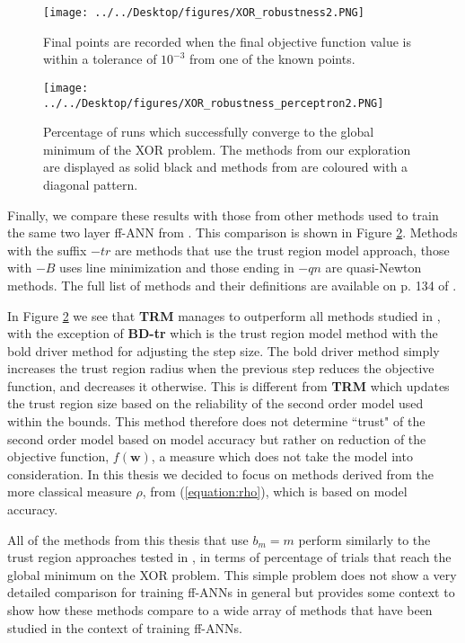 \documentclass[letterpaper,12pt,titlepage,oneside,final]{book}
\begin{document}
	\begin{figure}[h]
		\centering
		\texttt{[image: ../../Desktop/figures/XOR\_robustness2.PNG]}
		\caption{Final points are recorded when the final objective function value is within a tolerance of $10^{-3}$ from one of the known points.}
		\label{figure:XOR}
	\end{figure}

	
	\begin{figure}[h]
		\centering
		\texttt{[image: ../../Desktop/figures/XOR\_robustness\_perceptron2.PNG]}
		\caption{Percentage of runs which successfully converge to the global minimum of the XOR problem. The methods from our exploration are displayed as solid black and methods from \cite{Shepherd.1997} are coloured with a diagonal pattern.}
		\label{figure:XOR_comparison}
	\end{figure}
	Finally, we compare these results with those from other methods used to train the same two layer ff-ANN from \cite{Shepherd.1997}. This comparison is shown in Figure \ref{figure:XOR_comparison}. Methods with the suffix $-tr$ are methods that use the trust region model approach, those with $-B$ uses line minimization and those ending in $-qn$ are quasi-Newton methods. The full list of methods and their definitions are available on p. 134 of \cite{Shepherd.1997}.
	
	In Figure \ref{figure:XOR_comparison} we see that \textbf{TRM} manages to outperform all methods studied in \cite{Shepherd.1997}, with the exception of \textbf{BD-tr} which is the trust region model method with the bold driver method for adjusting the step size. The bold driver method simply increases the trust region radius when the previous step reduces the objective function, and decreases it otherwise. This is different from \textbf{TRM} which updates the trust region size based on the reliability of the second order model used within the bounds. This method therefore does not determine ``trust" of the second order model based on model accuracy but rather on reduction of the objective function, $f(\mathbf{w})$, a measure which does not take the model into consideration. In this thesis we decided to focus on methods derived from the more classical measure $\rho$, from (\ref{equation:rho}), which is based on model accuracy. 
	
	All of the methods from this thesis that use $b_{m} = m$ perform similarly to the trust region approaches tested in \cite{Shepherd.1997}, in terms of percentage of trials that reach the global minimum on the XOR problem. This simple problem does not show a very detailed comparison for training ff-ANNs in general but provides some context to show how these methods compare to a wide array of methods that have been studied in the context of training ff-ANNs. 
	
\end{document}
